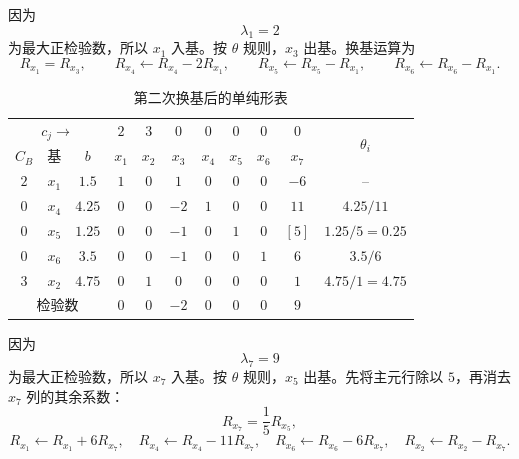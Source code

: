 ﻿\documentclass[UTF8,zihao=-4,fontset=none]{ctexart}
\begin{document}
因为
\[
    \lambda_1=2
\]
为最大正检验数，所以 \(x_1\) 入基。按 \(\theta\) 规则，\(x_3\) 出基。换基运算为
\[
    R_{x_1}=R_{x_3},\qquad
    R_{x_4}\leftarrow R_{x_4}-2R_{x_1},\qquad
    R_{x_5}\leftarrow R_{x_5}-R_{x_1},\qquad
    R_{x_6}\leftarrow R_{x_6}-R_{x_1}.
\]

\begin{table}[H]
\centering
{}
\setlength{\tabcolsep}{2.2pt}
\caption{第二次换基后的单纯形表}
\begin{tabular}{ccccccccccc}
\toprule
\multicolumn{3}{c}{$c_j\rightarrow$} & \(2\) & \(3\) & \(0\) & \(0\) & \(0\) & \(0\) & \(0\) & \multirow{2}{*}{\(\theta_i\)}\\
\(C_B\) & 基 & \(b\) & \(x_1\) & \(x_2\) & \(x_3\) & \(x_4\) & \(x_5\) & \(x_6\) & \(x_7\) &\\
\midrule
\(2\) & \(x_1\) & \(1.5\)  & \(1\) & \(0\) & \(1\) & \(0\) & \(0\) & \(0\) & \(-6\) & --\\
\(0\) & \(x_4\) & \(4.25\) & \(0\) & \(0\) & \(-2\) & \(1\) & \(0\) & \(0\) & \(11\) & \(4.25/11\)\\
\(0\) & \(x_5\) & \(1.25\) & \(0\) & \(0\) & \(-1\) & \(0\) & \(1\) & \(0\) & \([5]\) & \(1.25/5=0.25\)\\
\(0\) & \(x_6\) & \(3.5\)  & \(0\) & \(0\) & \(-1\) & \(0\) & \(0\) & \(1\) & \(6\) & \(3.5/6\)\\
\(3\) & \(x_2\) & \(4.75\) & \(0\) & \(1\) & \(0\) & \(0\) & \(0\) & \(0\) & \(1\) & \(4.75/1=4.75\)\\
\multicolumn{3}{c}{检验数} & \(0\) & \(0\) & \(-2\) & \(0\) & \(0\) & \(0\) & \(9\) &\\
\bottomrule
\end{tabular}
\end{table}

因为
\[
    \lambda_7=9
\]
为最大正检验数，所以 \(x_7\) 入基。按 \(\theta\) 规则，\(x_5\) 出基。先将主元行除以 \(5\)，再消去 \(x_7\) 列的其余系数：
\[
    R_{x_7}=\frac{1}{5}R_{x_5},
\]
\[
    R_{x_1}\leftarrow R_{x_1}+6R_{x_7},\quad
    R_{x_4}\leftarrow R_{x_4}-11R_{x_7},\quad
    R_{x_6}\leftarrow R_{x_6}-6R_{x_7},\quad
    R_{x_2}\leftarrow R_{x_2}-R_{x_7}.
\]
\end{document}

